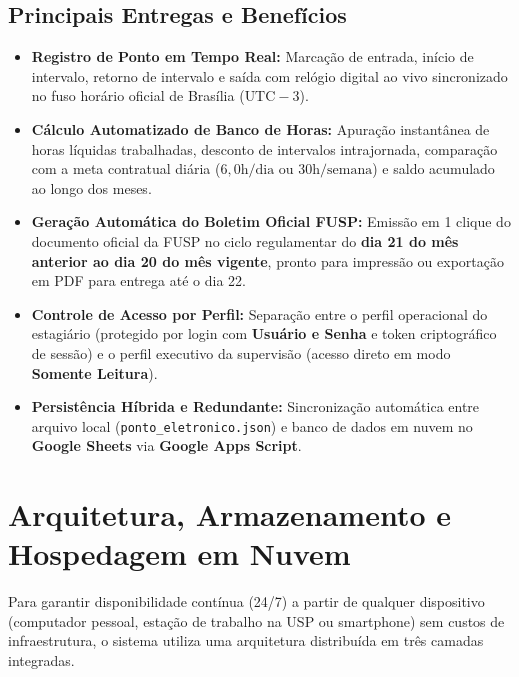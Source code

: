 \documentclass[11pt,a4paper]{article}
\begin{document}
\subsection{Principais Entregas e Benefícios}
\begin{itemize}[leftmargin=1.5em]
    \item \textbf{Registro de Ponto em Tempo Real:} Marcação de entrada, início de intervalo, retorno de intervalo e saída com relógio digital ao vivo sincronizado no fuso horário oficial de Brasília ($\text{UTC}-3$).
    \item \textbf{Cálculo Automatizado de Banco de Horas:} Apuração instantânea de horas líquidas trabalhadas, desconto de intervalos intrajornada, comparação com a meta contratual diária ($6,0\text{h/dia}$ ou $30\text{h/semana}$) e saldo acumulado ao longo dos meses.
    \item \textbf{Geração Automática do Boletim Oficial FUSP:} Emissão em 1 clique do documento oficial da FUSP no ciclo regulamentar do \textbf{dia 21 do mês anterior ao dia 20 do mês vigente}, pronto para impressão ou exportação em PDF para entrega até o dia 22.
    \item \textbf{Controle de Acesso por Perfil:} Separação entre o perfil operacional do estagiário (protegido por login com \textbf{Usuário e Senha} e token criptográfico de sessão) e o perfil executivo da supervisão (acesso direto em modo \textbf{Somente Leitura}).
    \item \textbf{Persistência Híbrida e Redundante:} Sincronização automática entre arquivo local (\texttt{ponto\_eletronico.json}) e banco de dados em nuvem no \textbf{Google Sheets} via \textbf{Google Apps Script}.
\end{itemize}

\section{Arquitetura, Armazenamento e Hospedagem em Nuvem}

Para garantir disponibilidade contínua (24/7) a partir de qualquer dispositivo (computador pessoal, estação de trabalho na USP ou smartphone) sem custos de infraestrutura, o sistema utiliza uma arquitetura distribuída em três camadas integradas.
\end{document}
